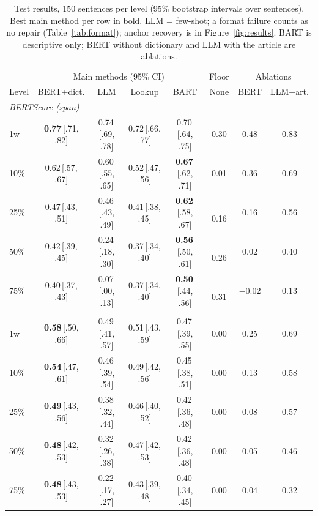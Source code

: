 \begin{table}[t]
\centering
\small\setlength{\tabcolsep}{4pt}
\begin{tabular}{lccccc|cc}
\toprule
 & \multicolumn{4}{c}{Main methods (95\% CI)} & Floor & \multicolumn{2}{c}{Ablations} \\
Level & BERT+dict. & LLM & Lookup & BART & None & BERT & LLM+art. \\
\midrule
\multicolumn{8}{l}{\textit{BERTScore (span)}} \\
1w & \textbf{0.77}\,{\tiny[.71, .82]} & 0.74\,{\tiny[.69, .78]} & 0.72\,{\tiny[.66, .77]} & 0.70\,{\tiny[.64, .75]} & 0.30 & 0.48 & 0.83 \\
10\% & 0.62\,{\tiny[.57, .67]} & 0.60\,{\tiny[.55, .65]} & 0.52\,{\tiny[.47, .56]} & \textbf{0.67}\,{\tiny[.62, .71]} & 0.01 & 0.36 & 0.69 \\
25\% & 0.47\,{\tiny[.43, .51]} & 0.46\,{\tiny[.43, .49]} & 0.41\,{\tiny[.38, .45]} & \textbf{0.62}\,{\tiny[.58, .67]} & $-$0.16 & 0.16 & 0.56 \\
50\% & 0.42\,{\tiny[.39, .45]} & 0.24\,{\tiny[.18, .30]} & 0.37\,{\tiny[.34, .40]} & \textbf{0.56}\,{\tiny[.50, .61]} & $-$0.26 & 0.02 & 0.40 \\
75\% & 0.40\,{\tiny[.37, .43]} & 0.07\,{\tiny[.00, .13]} & 0.37\,{\tiny[.34, .40]} & \textbf{0.50}\,{\tiny[.44, .56]} & $-$0.31 & $-$0.02 & 0.13 \\
\midrule
\multicolumn{8}{l}{\textit{\frr{}}} \\
1w & \textbf{0.58}\,{\tiny[.50, .66]} & 0.49\,{\tiny[.41, .57]} & 0.51\,{\tiny[.43, .59]} & 0.47\,{\tiny[.39, .55]} & 0.00 & 0.25 & 0.69 \\
10\% & \textbf{0.54}\,{\tiny[.47, .61]} & 0.46\,{\tiny[.39, .54]} & 0.49\,{\tiny[.42, .56]} & 0.45\,{\tiny[.38, .51]} & 0.00 & 0.13 & 0.58 \\
25\% & \textbf{0.49}\,{\tiny[.43, .56]} & 0.38\,{\tiny[.32, .44]} & 0.46\,{\tiny[.40, .52]} & 0.42\,{\tiny[.36, .48]} & 0.00 & 0.08 & 0.57 \\
50\% & \textbf{0.48}\,{\tiny[.42, .53]} & 0.32\,{\tiny[.26, .38]} & 0.47\,{\tiny[.42, .53]} & 0.42\,{\tiny[.36, .48]} & 0.00 & 0.05 & 0.46 \\
75\% & \textbf{0.48}\,{\tiny[.43, .53]} & 0.22\,{\tiny[.17, .27]} & 0.43\,{\tiny[.39, .48]} & 0.40\,{\tiny[.34, .45]} & 0.00 & 0.04 & 0.32 \\
\bottomrule
\end{tabular}
\caption{Test results, 150 sentences per level (95\% bootstrap intervals over sentences). Best main method per row in bold. LLM = few-shot; a format failure counts as no repair (Table~\ref{tab:format}); anchor recovery is in Figure~\ref{fig:results}. BART is descriptive only; BERT without dictionary and LLM with the article are ablations.}
\label{tab:results}
\end{table}
